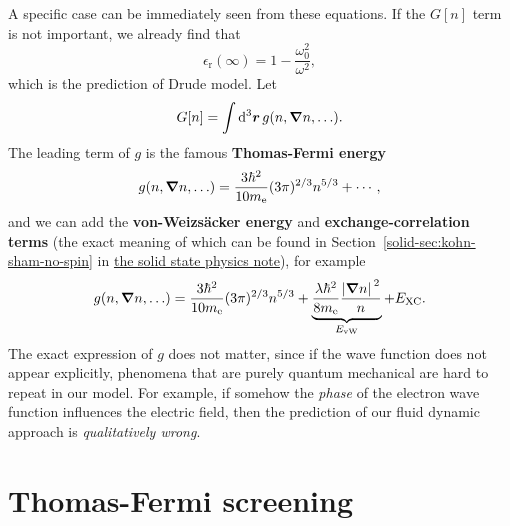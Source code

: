 \documentclass[hyperref, a4paper]{article}
\newcommand*{\concept}[1]{{\textbf{#1}}}
\newcommand{\soliddoc}{\href{../solid/solid}{the solid state physics note}}
\begin{document}
A specific case can be immediately seen from these equations. If the $G[n]$ term is not important, we already find that 
\begin{equation}
    \epsilon_\text{r}(\infty) = 1 - \frac{\omega_0^2}{\omega^2},
\end{equation}
which is the prediction of Drude model.
Let 
\begin{equation}
    G[n] = \int \dd[3]{\vb*{r}} g(n, \grad{n}, \ldots) .
\end{equation}
The leading term of $g$ is the famous \concept{Thomas-Fermi energy} 
\begin{equation}
    g(n, \grad{n}, \ldots) = \frac{3 \hbar^2}{10 m_\text{e}} (3\pi)^{2/3} n^{5/3} + \cdots,
\end{equation}
and we can add the \concept{von-Weizsäcker energy} and \concept{exchange-correlation terms} (the exact meaning of which can be found in Section~\ref{solid-sec:kohn-sham-no-spin} in \soliddoc), for example 
\begin{equation}
    g(n, \grad{n}, \ldots) = \frac{3 \hbar^2}{10 m_\text{e}} (3\pi)^{2/3} n^{5/3} + \underbrace{\frac{\lambda \hbar^2}{8 m_\text{e}} \frac{\abs*{\grad{n}}^2}{n}}_{E_\text{vW}} + E_\text{XC}.
    \label{eq:simple-functional}
\end{equation}
The exact expression of $g$ does not matter, since if the wave function does not appear explicitly, phenomena that are purely quantum mechanical are hard to repeat in our model.
For example, if somehow the \emph{phase} of the electron wave function influences the electric field, then the prediction of our fluid dynamic approach is \emph{qualitatively wrong}.

\section{Thomas-Fermi screening}
\end{document}
